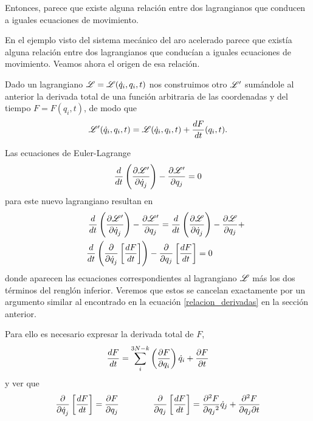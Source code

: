 \documentclass[10pt,oneside]{CBFT_book}
\begin{document}
Entonces, parece que existe alguna relación entre dos lagrangianos que conducen a iguales ecuaciones de movimiento.

En el ejemplo visto del sistema mecánico del aro acelerado parece que existía alguna relación entre dos 
lagrangianos que conducían a iguales ecuaciones de movimiento. Veamos ahora el origen de esa relación.

Dado un lagrangiano $\Lag = \Lag(\dot{q}_i,q_i,t)$ nos construimos otro $\Lag'$ sumándole al anterior la 
derivada total de una función arbitraria de las coordenadas y del tiempo $F=F(q_i,t)$, de modo que
\[
	\Lag'(\dot{q}_i,q_i,t) = \Lag(\dot{q}_i,q_i,t)+ \dtot{F}{t}(q_i,t) .
\]

Las ecuaciones de Euler-Lagrange 
\[
	\frac{d}{dt}\left(\dpar{\Lag'}{\dot{q}_j}\right) - \dpar{\Lag'}{q_j} = 0
\]
para este nuevo lagrangiano resultan en
\begin{multline}
 	\qquad \frac{d}{dt}\left(\dpar{\Lag'}{\dot{q}_j}\right) - \dpar{\Lag'}{q_j} =
 	\dtot{}{t}\left(\dpar{\Lag}{\dot{q}_j}\right) - \dpar{\Lag}{q_j} + \\
 	\dtot{}{t}\left(\dpar{}{\dot{q}_j}\left[ \dtot{F}{t} \right]\right) 
	- \dpar{}{q_j}\left[ \dtot{F}{t}\right] = 0 \qquad \label{ecEL_lag_suma}	
\end{multline}
donde aparecen las ecuaciones correspondientes al lagrangiano $\Lag$ más los dos términos del 
renglón inferior.
Veremos que estos se cancelan exactamente por un argumento similar al encontrado en la ecuación
\eqref{relacion_derivadas} en la sección anterior.

Para ello es necesario expresar la derivada total de $F$,
\[
	\dtot{F}{t} = \sum_i^{3N-k} \left( \dpar{F}{q_i} \right) \dot{q}_i + \dpar{F}{t}
\]
y ver que
\[
	\dpar{}{\dot{q}_j}\left[ \dtot{F}{t}\right] = \dpar{F}{q_j} \qquad\qquad
	\dpar{}{q_j}\left[ \dtot{F}{t}\right] = \dpar[2]{F}{q_j} \dot{q}_j + \dparcru{F}{t}{q_j} 
\]
\end{document}
